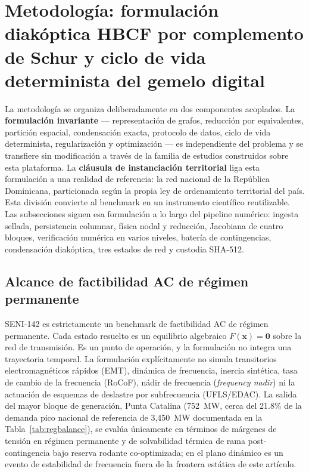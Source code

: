 \section{Metodología: formulación diakóptica HBCF por complemento de Schur y ciclo de vida determinista del gemelo digital}
\label{sec:methodology}

La metodología se organiza deliberadamente en dos componentes acoplados. La \textbf{formulación invariante} --- representación de grafos, reducción por equivalentes, partición espacial, condensación exacta, protocolo de datos, ciclo de vida determinista, regularización y optimización --- es independiente del problema y se transfiere sin modificación a través de la familia de estudios construidos sobre esta plataforma. La \textbf{cláusula de instanciación territorial} liga esta formulación a una realidad de referencia: la red nacional de la República Dominicana, particionada según la propia ley de ordenamiento territorial del país. Esta división convierte al benchmark en un instrumento científico reutilizable. Las subsecciones siguen esa formulación a lo largo del pipeline numérico: ingesta sellada, persistencia columnar, física nodal y reducción, Jacobiana de cuatro bloques, verificación numérica en varios niveles, batería de contingencias, condensación diakóptica, tres estados de red y custodia SHA-512.

\subsection{Alcance de factibilidad AC de régimen permanente}
\label{sub:scope}

SENI-142 es estrictamente un benchmark de factibilidad AC de régimen permanente. Cada estado resuelto es un equilibrio algebraico $F(\mathbf{x})=\mathbf{0}$ sobre la red de transmisión. Es un punto de operación, y la formulación no integra una trayectoria temporal. La formulación explícitamente no simula transitorios electromagnéticos rápidos (EMT), dinámica de frecuencia, inercia sintética, tasa de cambio de la frecuencia (RoCoF), nádir de frecuencia (\emph{frequency nadir}) ni la actuación de esquemas de deslastre por subfrecuencia (UFLS/EDAC). La salida del mayor bloque de generación, Punta Catalina (752~MW, cerca del 21.8\% de la demanda pico nacional de referencia de 3,450~MW documentada en la Tabla~\ref{tab:regbalance}), se evalúa únicamente en términos de márgenes de tensión en régimen permanente y de solvabilidad térmica de rama post-contingencia bajo reserva rodante co-optimizada; en el plano dinámico es un evento de estabilidad de frecuencia fuera de la frontera estática de este artículo.

